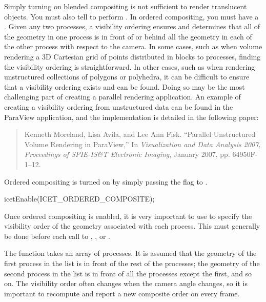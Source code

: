 
Simply turning on blended compositing is not sufficient to render
translucent objects.  You must also tell \IceT to perform .  In ordered compositing, you must have a
.  Given any two
processes, a visibility ordering ensures and determines that all of the
geometry in one process is in front of or behind all the geometry in each
of the other process with respect to the camera.  In some cases, such as
when volume rendering a 3D Cartesian grid of points distributed in blocks
to processes, finding the visibility ordering is straightforward.  In other
cases, such as when rendering unstructured collections of polygons or
polyhedra, it can be difficult to ensure that a visibility ordering exists
and can be found.  Doing so may be the most challenging part of creating a
parallel rendering application.  An example of creating a visibility
ordering from unstructured data can be found in the ParaView application,
and the implementation is detailed in the following paper:

\begin{quote}
  Kenneth Moreland, Lisa Avila, and Lee Ann Fisk. ``Parallel Unstructured
  Volume Rendering in ParaView,'' In \emph{Visualization and Data Analysis
    2007, Proceedings of SPIE-IS\&T Electronic Imaging}, January 2007,
  pp. 64950F-1--12.
\end{quote}

Ordered compositing is turned on by simply passing the
 flag to .
\begin{code}
icetEnable(ICET_ORDERED_COMPOSITE);
\end{code}

Once ordered compositing is enabled, it is very important to use
 to specify the visibility order of the geometry
associated with each process.  This must generally be done before each call
to , , or
.
\begin{Table}{1}
  \textC{(} 
   \textC{);}
\end{Table}
The  function takes an array of processes.  It is
assumed that the geometry of the first process in the list is in front of
the rest of the processes; the geometry of the second process in the list
is in front of all the processes except the first, and so on.  The
visibility order often changes when the camera angle changes, so it is
important to recompute and report a new composite order on every frame.

